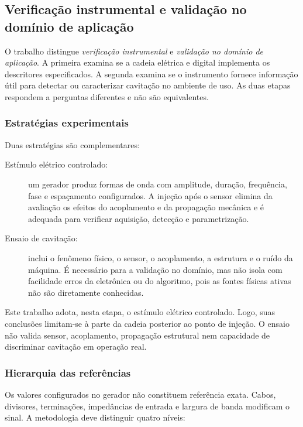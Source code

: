 \subsection{Verificação instrumental e validação no domínio de aplicação}
\label{v2:subsec:metodologia_validacao}

O trabalho distingue \textit{verificação instrumental} e \textit{validação no domínio de aplicação}. A primeira examina se a cadeia elétrica e digital implementa os descritores especificados. A segunda examina se o instrumento fornece informação útil para detectar ou caracterizar cavitação no ambiente de uso. As duas etapas respondem a perguntas diferentes e não são equivalentes.

\subsubsection{Estratégias experimentais}
Duas estratégias são complementares:

\begin{description}
	\item[Estímulo elétrico controlado:] um gerador produz formas de onda com amplitude, duração, frequência, fase e espaçamento configurados. A injeção após o sensor elimina da avaliação os efeitos do acoplamento e da propagação mecânica e é adequada para verificar aquisição, detecção e parametrização.
	
	\item[Ensaio de cavitação:] inclui o fenômeno físico, o sensor, o acoplamento, a estrutura e o ruído da máquina. É necessário para a validação no domínio, mas não isola com facilidade erros da eletrônica ou do algoritmo, pois as fontes físicas ativas não são diretamente conhecidas.
\end{description}

Este trabalho adota, nesta etapa, o estímulo elétrico controlado. Logo, suas conclusões limitam-se à parte da cadeia posterior ao ponto de injeção. O ensaio não valida sensor, acoplamento, propagação estrutural nem capacidade de discriminar cavitação em operação real.

\subsubsection{Hierarquia das referências}
Os valores configurados no gerador não constituem referência exata. Cabos, divisores, terminações, impedâncias de entrada e largura de banda modificam o sinal. A metodologia deve distinguir quatro níveis:

